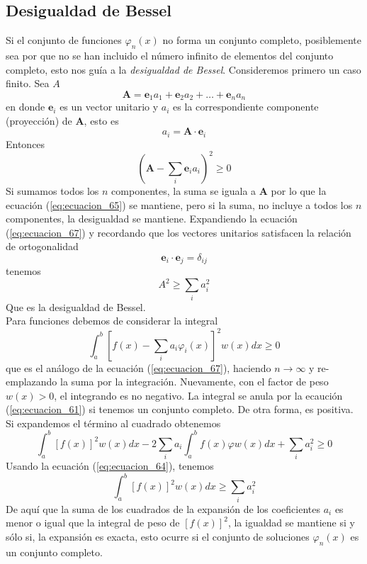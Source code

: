 \subsection{Desigualdad de Bessel}
Si el conjunto de funciones $\varphi_{n} (x)$ no forma un conjunto completo, posiblemente sea por que no se han incluido el número infinito de elementos del conjunto completo,  esto nos guía a la \emph{desigualdad de Bessel}. Consideremos primero un caso finito. Sea $A$ 
\begin{equation}
\mathbf{A} = \mathbf{e}_{1} a_{1} + \mathbf{e}_{2} a_{2} + \ldots + \mathbf{e}_{n} a_{n} 
\label{eq:ecuacion_65}
\end{equation}
en donde $\mathbf{e}_{i}$ es un vector unitario y $a_{i}$ es la correspondiente componente (proyección) de $\mathbf{A}$, esto es
\begin{equation}
a_{i} = \mathbf{A} \cdot \mathbf{e}_{i} \label{eq:ecuacion_66}
\end{equation}
Entonces
\begin{equation}
\left( \mathbf{A} - \sum_{i} \mathbf{e}_{i} a_{i} \right)^{2} \geq 0 \label{eq:ecuacion_67}
\end{equation}
Si sumamos todos los $n$ componentes, la suma se iguala a $\mathbf{A}$ por lo que la ecuación (\ref{eq:ecuacion_65}) se mantiene, pero si la suma, no incluye a todos los $n$ componentes, la desigualdad se mantiene. Expandiendo la ecuación (\ref{eq:ecuacion_67}) y recordando que los vectores unitarios satisfacen la relación de ortogonalidad
\begin{equation}
\mathbf{e}_{i} \cdot \mathbf{e}_{j} =  \delta_{ij} \label{eq:ecuacion_68}
\end{equation}
tenemos
\begin{equation}
A^{2} \geq \sum_{i} a_{i}^{2} \label{eq:ecuacion_69}
\end{equation}
Que es la desigualdad de Bessel.
\\
Para funciones debemos de considerar la integral
\begin{equation}
\int_{a}^{b} \left[ f(x) - \sum_{i} a_{i} \varphi_{i}(x) \right]^{2} w(x) dx \geq 0 \label{eq:ecuacion_70}
\end{equation}
que es el análogo de la ecuación (\ref{eq:ecuacion_67}), haciendo $n \to \infty$ y re-emplazando la suma por la integración. Nuevamente, con el factor de peso $w(x) >0 $, el integrando es no negativo. La integral se anula por la ecaución (\ref{eq:ecuacion_61}) si tenemos un conjunto completo. De otra forma, es positiva. Si expandemos el término al cuadrado obtenemos
\begin{equation}
\int_{a}^{b} [ f(x) ]^{2} w(x) dx - 2 \sum_{i} a_{i} \int_{a}^{b} f(x) \varphi w(x) dx  + \sum_{i} a_{i}^{2} \geq 0
\label{eq:ecuacion_71}
\end{equation}
Usando la ecuación (\ref{eq:ecuacion_64}), tenemos
\begin{equation}
\int_{a}^{b} [f(x)]^{2} w(x) dx \geq \sum_{i} a_{i}^{2} \label{eq:ecuacion_72}
\end{equation}
De aquí que la suma de los cuadrados de la expansión de los coeficientes $a_{i}$ es menor o igual que la integral de peso de $[f(x)]^{2}$, la igualdad se mantiene si y sólo si, la expansión es exacta, esto ocurre si el conjunto de soluciones $\varphi_{n}(x)$ es un conjunto completo.

